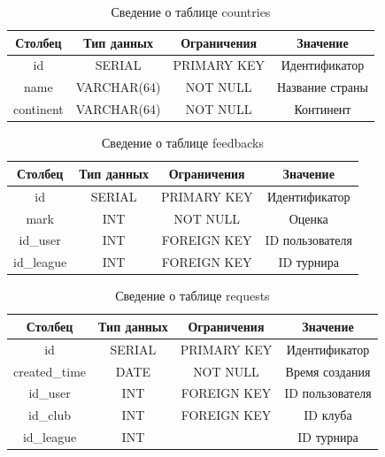 \begin{table}[H]
	\begin{center}
		\caption{Сведение о таблице countries}
		\begin{tabular}{|c|c|c|c|}
			\hline
			Столбец & Тип данных & Ограничения & Значение \\
			\hline
			id & SERIAL & PRIMARY KEY & Идентификатор \\
			\hline
			name & VARCHAR(64) & NOT NULL & Название страны \\
			\hline
			continent & VARCHAR(64) & NOT NULL & Континент \\
			\hline
		\end{tabular}
		\label{table:db:country}
	\end{center}
\end{table}

\begin{table}[H]
	\begin{center}
		\caption{Сведение о таблице feedbacks}
		\begin{tabular}{|c|c|c|c|}
			\hline
			Столбец & Тип данных & Ограничения & Значение \\
			\hline
			id & SERIAL & PRIMARY KEY & Идентификатор \\
			\hline
			mark & INT & NOT NULL & Оценка \\
			\hline
			id\_user & INT & FOREIGN KEY & ID пользователя \\
			\hline
			id\_league & INT & FOREIGN KEY & ID турнира \\
			\hline
		\end{tabular}
		\label{table:db:feedback}
	\end{center}
\end{table}

\begin{table}[H]
	\begin{center}
		\caption{Сведение о таблице requests}
		\begin{tabular}{|c|c|c|c|}
			\hline
			Столбец & Тип данных & Ограничения & Значение \\
			\hline
			id & SERIAL & PRIMARY KEY & Идентификатор \\
			\hline
			created\_time & DATE & NOT NULL & Время создания \\
			\hline
			id\_user & INT & FOREIGN KEY & ID пользователя \\
			\hline
			id\_club & INT & FOREIGN KEY & ID клуба \\
			\hline
			id\_league & INT &  & ID турнира \\
			\hline
		\end{tabular}
		\label{table:db:request}
	\end{center}
\end{table}

